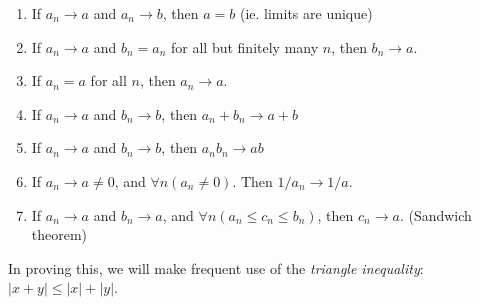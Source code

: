 \documentclass[a4paper]{article}
\begin{document}
\begin{thm}\leavevmode
  \begin{enumerate}
    \item If $a_n\to a$ and $a_n\to b$, then $a = b$ (ie. limits are unique)
    \item If $a_n \to a$ and $b_n = a_n$ for all but finitely many $n$, then $b_n \to a$.
    \item If $a_n = a$ for all $n$, then $a_n \to a$.
    \item If $a_n\to a$ and $b_n\to b$, then $a_n + b_n \to a+ b$
    \item If $a_n\to a$ and $b_n \to b$, then $a_nb_n\to ab$
    \item If $a_n\to a\not= 0$, and $\forall n(a_n \not= 0)$. Then $1/a_n \to 1/a$.
    \item If $a_n \to a$ and $b_n \to a$, and $\forall n(a_n\leq c_n\leq b_n)$, then $c_n \to a$. (Sandwich theorem)
  \end{enumerate}
\end{thm}
In proving this, we will make frequent use of the \emph{triangle inequality}: $|x + y|\leq |x| + |y|$.
\end{document}
